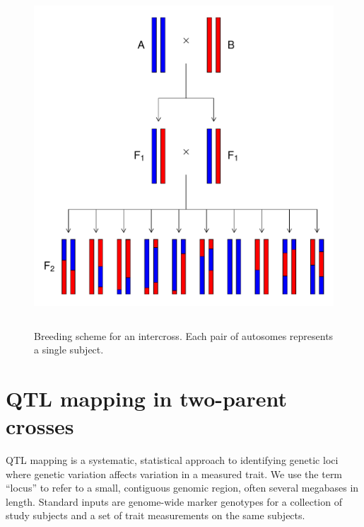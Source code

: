 \documentclass[oneside]{book}\usepackage[]{graphicx}\usepackage[]{color}
\makeatletter
\def\maxwidth{ %
  \ifdim\Gin@nat@width>\linewidth
    \linewidth
  \else
    \Gin@nat@width
  \fi
}
\newenvironment{knitrout}{}{} %
\makeatother
\begin{document}
\begin{knitrout}
\color{fgcolor}\begin{figure}
\includegraphics[width=\maxwidth,height=5in]{figure/intercross-1} \caption[Breeding scheme for an intercross]{Breeding scheme for an intercross. Each pair of autosomes represents a single subject.}\label{fig:intercross}
\end{figure}


\end{knitrout}


\section{QTL mapping in two-parent crosses}\label{sec:qtl-two-parent}

QTL mapping is a systematic, statistical approach to identifying genetic
loci where genetic variation affects variation in a measured trait.
We use the term ``locus'' to refer to a small, contiguous genomic region, often
several megabases in length. Standard inputs are genome-wide marker genotypes
for a collection of study subjects and a set of trait measurements on the same subjects.
\end{document}
